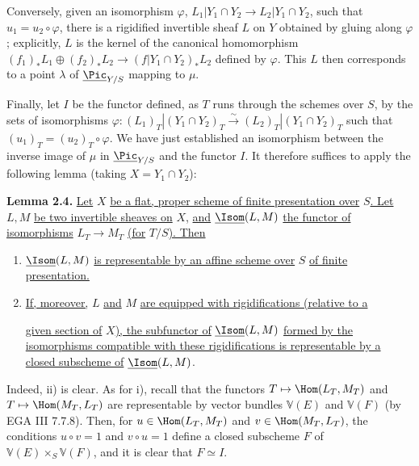Conversely, given an isomorphism \(\varphi\), \(L_1|Y_1\cap Y_2\to L_2|Y_1\cap Y_2\), such that \(u_1=u_2\circ\varphi\), there is a rigidified invertible sheaf \(L\) on \(Y\) obtained by gluing along \(\varphi\); explicitly, \(L\) is the kernel of the canonical homomorphism \((f_1)_*L_1\oplus(f_2)_*L_2\longrightarrow(f|Y_1\cap Y_2)_*L_2\) defined by \(\varphi\). This \(L\) then corresponds to a point \(\lambda\) of \(\underline{\Pic}_{Y/S}\) mapping to \(\mu\).

Finally, let \(I\) be the functor defined, as \(T\) runs through the schemes over \(S\), by the sets of isomorphisms \(\varphi:(L_1)_T|(Y_1\cap Y_2)_T\xrightarrow{\sim}(L_2)_T|(Y_1\cap Y_2)_T\) such that \((u_1)_T=(u_2)_T\circ\varphi\). We have just established an isomorphism between the inverse image of \(\mu\) in \(\underline{\Pic}_{Y/S}\) and the functor \(I\). It therefore suffices to apply the following lemma (taking \(X=Y_1\cap Y_2\)):

\textbf{Lemma 2.4.} \uline{Let} \(X\) \uline{be a flat, proper scheme of finite presentation over} \(S\)\uline{. Let} \(L,M\) \uline{be two invertible sheaves on} \(X\), \uline{and} \(\underline{\Isom}(L,M)\) \uline{the functor of isomorphisms} \(L_T\to M_T\) \uline{(for} \(T/S\)\uline{). Then}
\begin{enumerate}[label=\roman*)]
\item \(\underline{\Isom}(L,M)\) \uline{is representable by an affine scheme over} \(S\) \uline{of finite presentation.}
\item \uline{If, moreover,} \(L\) \uline{and} \(M\) \uline{are equipped with rigidifications (relative to a}


%
\uline{given section of} \(X\)\uline{), the subfunctor of} \(\underline{\Isom}(L,M)\) \uline{formed by the isomorphisms compatible with these rigidifications is representable by a closed subscheme of} \(\underline{\Isom}(L,M)\).
\end{enumerate}

Indeed, ii) is clear. As for i), recall that the functors \(T\mapsto\Hom(L_T,M_T)\) and \(T\mapsto\Hom(M_T,L_T)\) are representable by vector bundles \(\mathbb V(E)\) and \(\mathbb V(F)\) (by EGA III 7.7.8). Then, for \(u\in\Hom(L_T,M_T)\) and \(v\in\Hom(M_T,L_T)\), the conditions \(u\circ v=1\) and \(v\circ u=1\) define a closed subscheme \(F\) of \(\mathbb V(E)\times_S\mathbb V(F)\), and it is clear that \(F\simeq I\).

